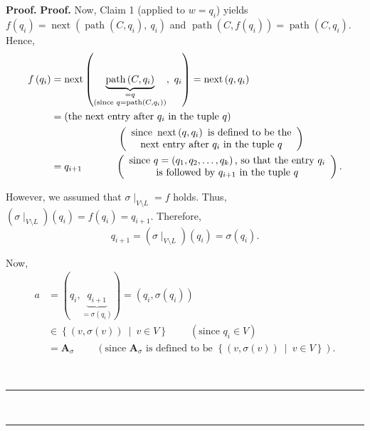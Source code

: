 \documentclass[numbers=enddot,12pt,final,onecolumn,notitlepage]{scrartcl}%
\numberwithin{exer}{section}
\theoremstyle{definition}
\newenvironment{proof}[1][Proof]{\noindent\textbf{#1.} }{\ \rule{0.5em}{0.5em}}
\newenvironment{verlong}{}{}
\begin{document}
\begin{verlong}
\begin{proof}
\begin{proof}
Now, Claim 1 (applied to $w=q_{i}$) yields $f\left(  q_{i}\right)
=\operatorname*{next}\left(  \operatorname*{path}\left(  C,q_{i}\right)
,\ q_{i}\right)  $ and $\operatorname*{path}\left(  C,f\left(  q_{i}\right)
\right)  =\operatorname*{path}\left(  C,q_{i}\right)  $. Hence,%
\begin{align*}
f\left(  q_{i}\right)   &  =\operatorname*{next}\left(
\underbrace{\operatorname*{path}\left(  C,q_{i}\right)  }%
_{\substack{=q\\\text{(since }q=\operatorname*{path}\left(  C,q_{i}\right)
\text{)}}},\ q_{i}\right)  =\operatorname*{next}\left(  q,q_{i}\right) \\
&  =\left(  \text{the next entry after }q_{i}\text{ in the tuple }q\right) \\
&  \ \ \ \ \ \ \ \ \ \ \ \ \ \ \ \ \ \ \ \ \left(
\begin{array}
[c]{c}%
\text{since }\operatorname*{next}\left(  q,q_{i}\right)  \text{ is defined to
be the}\\
\text{next entry after }q_{i}\text{ in the tuple }q
\end{array}
\right) \\
&  =q_{i+1}\ \ \ \ \ \ \ \ \ \ \left(
\begin{array}
[c]{c}%
\text{since }q=\left(  q_{1},q_{2},\ldots,q_{k}\right)  \text{, so that the
entry }q_{i}\\
\text{is followed by }q_{i+1}\text{ in the tuple }q
\end{array}
\right)  .
\end{align*}


However, we assumed that $\left.  \sigma\mid_{V\setminus L}\right.  =f$ holds.
Thus, $\left(  \sigma\mid_{V\setminus L}\right)  \left(  q_{i}\right)
=f\left(  q_{i}\right)  =q_{i+1}$. Therefore,%
\[
q_{i+1}=\left(  \sigma\mid_{V\setminus L}\right)  \left(  q_{i}\right)
=\sigma\left(  q_{i}\right)  .
\]


Now,
\begin{align*}
a  &  =\left(  q_{i},\underbrace{q_{i+1}}_{=\sigma\left(  q_{i}\right)
}\right)  =\left(  q_{i},\sigma\left(  q_{i}\right)  \right) \\
&  \in\left\{  \left(  v,\sigma\left(  v\right)  \right)  \ \mid\ v\in
V\right\}  \ \ \ \ \ \ \ \ \ \ \left(  \text{since }q_{i}\in V\right) \\
&  =\mathbf{A}_{\sigma}\ \ \ \ \ \ \ \ \ \ \left(  \text{since }%
\mathbf{A}_{\sigma}\text{ is defined to be }\left\{  \left(  v,\sigma\left(
v\right)  \right)  \ \mid\ v\in V\right\}  \right)  .
\end{align*}



\end{proof}
\end{proof}
\end{verlong}
\end{document}
